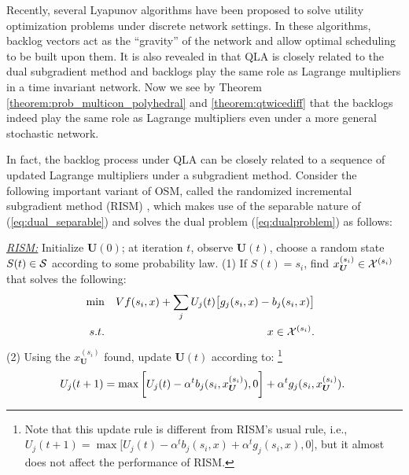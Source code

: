 \documentclass[journal]{IEEEtran}
\newcommand{\bv}[1]{{\boldsymbol{#1} }}
\newcommand{\script}[1]{{{\cal{#1} }}}
\begin{document}
Recently, several Lyapunov algorithms have been proposed to solve utility optimization problems under discrete network settings. In these algorithms, backlog vectors act as the ``gravity'' of the network and allow optimal scheduling to be built upon them. It is also revealed in \cite{neelypowerjsac} that QLA is closely related to the dual subgradient method and backlogs play the same role as Lagrange multipliers in a time invariant network. Now we see by Theorem \ref{theorem:prob_multicon_polyhedral} and \ref{theorem:qtwicediff}  that the backlogs indeed play the same role as Lagrange multipliers even under a more general stochastic network. 

In fact, the backlog process under QLA can be closely related to a sequence of updated Lagrange multipliers under a subgradient method. Consider the following important variant of OSM, called  the randomized incremental subgradient method (RISM) \cite{bertsekasoptbook}, which makes use of the separable nature of (\ref{eq:dual_separable}) and solves the dual problem (\ref{eq:dualproblem}) as follows:

\underline{\emph{RISM:}} Initialize $\bv{U}(0)$; at iteration $t$, observe $\bv{U}(t)$, choose a random state $S(t)\in\script{S}$ according to some probability law.
(1) If $S(t)=s_i$, find $x_{\bv{U}}^{(s_i)}\in\script{X}^{(s_i)}$ that solves the following:
\begin{eqnarray}
\hspace{-.1in}\min && Vf(s_i, x)+\sum_jU_j(t)\big[g_j(s_i, x)-b_j(s_i, x)\big]\nonumber \\
\hspace{-.1in}s.t. && x\in \script{X}^{(s_i)}.\label{eq:dual_ith_sub}
\end{eqnarray}
(2) Using the $x_{\bv{U}}^{(s_i)}$ found, update $\bv{U}(t)$ according to:  \footnote{Note that this update rule is different from RISM's usual rule, i.e., $U_j(t+1)=\max\big[U_j(t)-\alpha^t b_j(s_i, x)+\alpha^t g_j(s_i, x), 0\big]$, but it almost does not affect the performance of RISM.}
\begin{eqnarray*}
\hspace{-.05in}U_j(t+1)=\max\bigg[U_j(t)-\alpha^t b_j(s_i, x_{\bv{U}}^{(s_i)}),0\bigg]+\alpha^t g_j(s_i, x_{\bv{U}}^{(s_i)}).
\end{eqnarray*}
\end{document}
